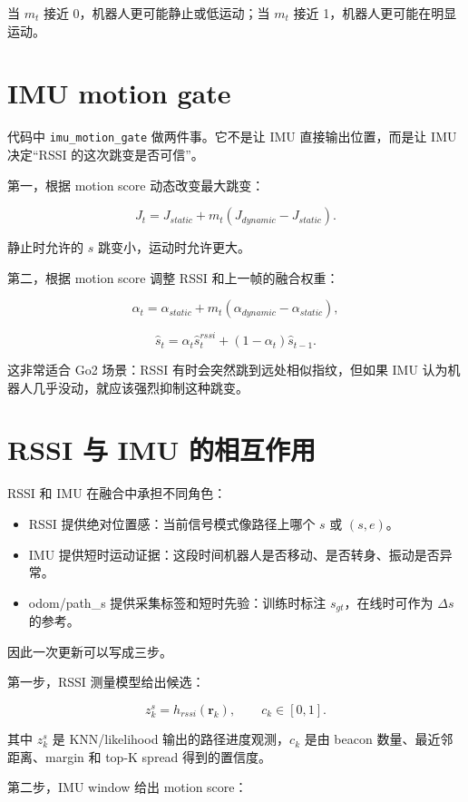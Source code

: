 \documentclass[11pt,a4paper,openany]{report}
\newcommand{\param}[1]{\nolinkurl{#1}}
\begin{document}
当 \(m_t\) 接近 0，机器人更可能静止或低运动；当 \(m_t\) 接近 1，机器人更可能在明显运动。

\section{IMU motion gate}

代码中 \param{imu_motion_gate} 做两件事。它不是让 IMU 直接输出位置，而是让 IMU 决定“RSSI 的这次跳变是否可信”。

第一，根据 motion score 动态改变最大跳变：

\[
  J_t =
  J_{static}
  +
  m_t (J_{dynamic}-J_{static}).
\]

静止时允许的 \(s\) 跳变小，运动时允许更大。

第二，根据 motion score 调整 RSSI 和上一帧的融合权重：

\[
  \alpha_t =
  \alpha_{static}
  +
  m_t(\alpha_{dynamic}-\alpha_{static}),
\]

\[
  \hat{s}_t =
  \alpha_t \hat{s}_t^{rssi}
  +(1-\alpha_t)\hat{s}_{t-1}.
\]

这非常适合 Go2 场景：RSSI 有时会突然跳到远处相似指纹，但如果 IMU 认为机器人几乎没动，就应该强烈抑制这种跳变。

\section{RSSI 与 IMU 的相互作用}

RSSI 和 IMU 在融合中承担不同角色：

\begin{itemize}
  \item RSSI 提供绝对位置感：当前信号模式像路径上哪个 \(s\) 或 \((s,e)\)。
  \item IMU 提供短时运动证据：这段时间机器人是否移动、是否转身、振动是否异常。
  \item odom/path\_s 提供采集标签和短时先验：训练时标注 \(s_{gt}\)，在线时可作为 \(\Delta s\) 的参考。
\end{itemize}

因此一次更新可以写成三步。

第一步，RSSI 测量模型给出候选：

\[
  z_k^s = h_{rssi}(\bm{r}_k),
  \qquad
  c_k \in [0,1].
\]

其中 \(z_k^s\) 是 KNN/likelihood 输出的路径进度观测，\(c_k\) 是由 beacon 数量、最近邻距离、margin 和 top-K spread 得到的置信度。

第二步，IMU window 给出 motion score：
\end{document}
